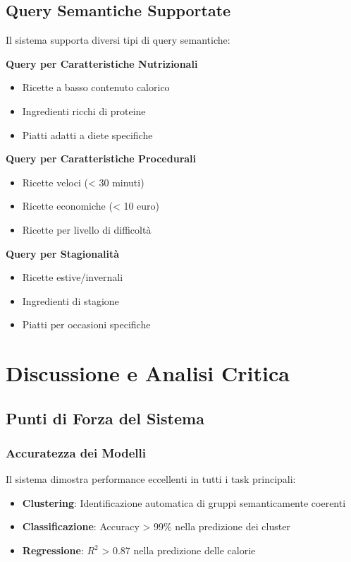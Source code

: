 \documentclass[12pt,a4paper]{article}
\begin{document}
\subsection{Query Semantiche Supportate}

Il sistema supporta diversi tipi di query semantiche:

\textbf{Query per Caratteristiche Nutrizionali}
\begin{itemize}
    \item Ricette a basso contenuto calorico
    \item Ingredienti ricchi di proteine
    \item Piatti adatti a diete specifiche
\end{itemize}

\textbf{Query per Caratteristiche Procedurali}
\begin{itemize}
    \item Ricette veloci (< 30 minuti)
    \item Ricette economiche (< 10 euro)
    \item Ricette per livello di difficoltà
\end{itemize}

\textbf{Query per Stagionalità}
\begin{itemize}
    \item Ricette estive/invernali
    \item Ingredienti di stagione
    \item Piatti per occasioni specifiche
\end{itemize}

\section{Discussione e Analisi Critica}

\subsection{Punti di Forza del Sistema}

\subsubsection{Accuratezza dei Modelli}

Il sistema dimostra performance eccellenti in tutti i task principali:
\begin{itemize}
    \item \textbf{Clustering}: Identificazione automatica di gruppi semanticamente coerenti
    \item \textbf{Classificazione}: Accuracy > 99\% nella predizione dei cluster
    \item \textbf{Regressione}: $R^2$ > 0.87 nella predizione delle calorie
\end{itemize}
\end{document}
